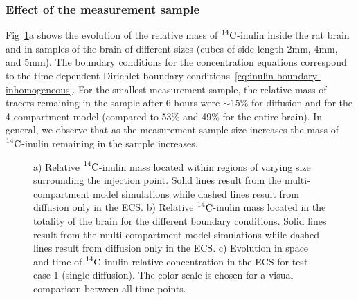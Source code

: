\documentclass[10pt]{article}
\newcommand{\VV}[1]{\textcolor{red}{VV: #1}}
\newcommand{\1}{^{(1)}}
\newcommand{\2}{^{(2)}}
\newcommand{\Cinulin}{$\prescript{14}{}{\text{C}}$-inulin }
\newcommand{\commentout}[1]{}
\begin{document}
\subsubsection{Effect of the measurement sample} 
Fig~\ref{fig:samples-Inulin}a shows the evolution of the relative mass of \Cinulin inside the rat brain and in samples of the brain of different sizes (cubes of side length 2\si{mm}, 4\si{mm}, and 5\si{mm}). The boundary conditions for the concentration equations correspond to the time dependent Dirichlet boundary conditions~\eqref{eq:inulin-boundary-inhomogeneous}. For the smallest measurement sample, the relative mass of tracers remaining in the sample after 6 hours were $\sim$15\% for diffusion and for the 4-compartment model (compared to 53\% and 49\% for the entire brain). In general, we observe that as the measurement sample size increases the mass of \Cinulin remaining in the sample increases.

\commentout{
 \begin{figure}[htbp]
     \centering
     \begin{subfigure}[t]{0.45\textwidth}
         \captionsetup{width=0.9\textwidth}
         \centering
         \caption{Single diffusion equation}
         \label{fig:diffusion-samples-Inulin}
     \end{subfigure}
     \hfill
     \begin{subfigure}[t]{0.45\textwidth}
         \captionsetup{width=0.9\textwidth}
         \centering
         \caption{Multi-compartment model.}
         \label{fig:multi-compartment-samples-Inulin}
     \end{subfigure}
     \caption{Relative \Cinulin mass located within regions of varying size surrounding the injection point. \VV{Figures need axis labels}}
     \label{fig:samples-Inulin}
\end{figure}
}

\begin{figure}
    \centering
    \caption{a) Relative \Cinulin mass located within regions of varying size surrounding the injection point.  Solid lines result from the multi-compartment model simulations while dashed lines result from diffusion only in the ECS. b) Relative \Cinulin mass located in the totality of the brain for the different boundary conditions.  Solid lines result from the multi-compartment model simulations while dashed lines result from diffusion only in the ECS. c) Evolution in space and time of \Cinulin relative concentration in the ECS for test case 1 (single diffusion). The color scale is chosen for a visual comparison between all time points.}
    \label{fig:samples-Inulin}
\end{figure}
\end{document}

